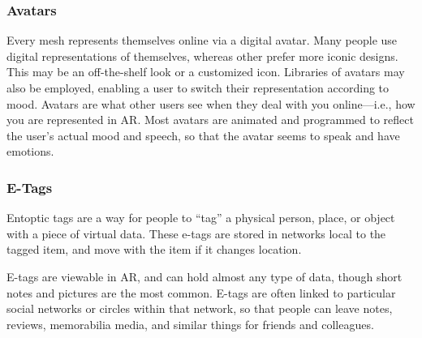 \subsubsection{Avatars} 

Every mesh represents themselves online via a digital avatar. Many people use digital representations of themselves, whereas other prefer more iconic designs. This may be an off-the-shelf look or a customized icon. Libraries of avatars may also be employed, enabling a user to switch their representation according to mood. Avatars are what other users see when they deal with you online—i.e., how you are represented in AR. Most avatars are animated and programmed to reflect the user's actual mood and speech, so that the avatar seems to speak and have emotions. 

\subsubsection{E-Tags} 

Entoptic tags are a way for people to ``tag'' a physical person, place, or object with a piece of virtual data. These e-tags are stored in networks local to the tagged item, and move with the item if it changes location. 

E-tags are viewable in AR, and can hold almost any type of data, though short notes and pictures are the most common. E-tags are often linked to particular social networks or circles within that network, so that people can leave notes, reviews, memorabilia media, and similar things for friends and colleagues. 



